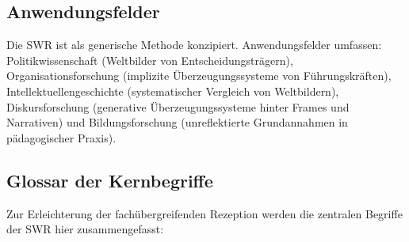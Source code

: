 \documentclass[11pt,a4paper]{article}
\theoremstyle{definition}
\theoremstyle{plain}
\theoremstyle{remark}
\begin{document}
\subsection{Anwendungsfelder}
\label{sec:anwendung}

Die SWR ist als generische Methode konzipiert. Anwendungsfelder umfassen: Politikwissenschaft (Weltbilder von Entscheidungstr\"agern), Organisationsforschung (implizite \"Uberzeugungssysteme von F\"uhrungskr\"aften), Intellektuellengeschichte (systematischer Vergleich von Weltbildern), Diskursforschung (generative \"Uberzeugungssysteme hinter Frames und Narrativen) und Bildungsforschung (unreflektierte Grundannahmen in p\"adagogischer Praxis).



\subsection{Glossar der Kernbegriffe}
\label{sec:glossar}

Zur Erleichterung der fach\"ubergreifenden Rezeption werden die zentralen Begriffe der SWR hier zusammengefasst:
\end{document}
